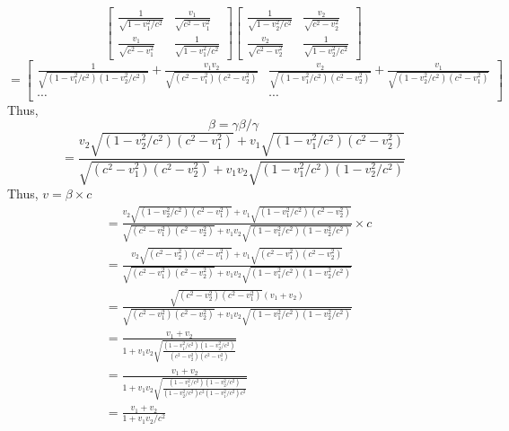 \documentclass{article}
\begin{document}
\begin{itemize}
                \[\begin{bmatrix} 
                        \frac{1}{\sqrt{1-v_1^2/c^2}}& \frac{v_1}{\sqrt{c^2-v_1^2}}\\
                        \frac{v_1}{\sqrt{c^2-v_1^2}}& \frac{1}{\sqrt{1-v_1^2/c^2}}
                \end{bmatrix}
                \begin{bmatrix}
                    \frac{1}{\sqrt{1-v_2^2/c^2}}& \frac{v_2}{\sqrt{c^2-v_2^2}}\\
                    \frac{v_2}{\sqrt{c^2-v_2^2}}& \frac{1}{\sqrt{1-v_2^2/c^2}}
                \end{bmatrix}\]\[=
                \begin{bmatrix}
                    \frac{1}{\sqrt{(1-v_1^2/c^2)(1-v_2^2/c^2)}}+\frac{v_1v_2}{\sqrt{(c^2-v_1^2)(c^2-v_2^2)}}&
                    \frac{v_2}{\sqrt{(1-v_1^2/c^2)(c^2-v_2^2)}}+\frac{v_1}{\sqrt{(1-v_2^2/c^2)(c^2-v_1^2)}}
                    \\ \cdots&\cdots
                \end{bmatrix}\]
                Thus, \[\beta = \gamma \beta / \gamma\]
                \[=\frac{v_2\sqrt{(1-v_2^2/c^2)(c^2-v_1^2)}+v_1\sqrt{(1-v_1^2/c^2)(c^2-v_2^2)}}{\sqrt{(c^2-v_1^2)(c^2-v_2^2)}+v_1v_2\sqrt{(1-v_1^2/c^2)(1-v_2^2/c^2)}}\]
                Thus, \(v = \beta \times c\)
                \begin{align*}
                    &=\frac{v_2\sqrt{(1-v_2^2/c^2)(c^2-v_1^2)}+v_1\sqrt{(1-v_1^2/c^2)(c^2-v_2^2)}}{\sqrt{(c^2-v_1^2)(c^2-v_2^2)}+v_1v_2\sqrt{(1-v_1^2/c^2)(1-v_2^2/c^2)}}
                    \times c\\&=\frac{v_2\sqrt{(c^2-v_2^2)(c^2-v_1^2)}+v_1\sqrt{(c^2-v_1^2)(c^2-v_2^2)}}{\sqrt{(c^2-v_1^2)(c^2-v_2^2)}+v_1v_2\sqrt{(1-v_1^2/c^2)(1-v_2^2/c^2)}}
                    \\&=\frac{\sqrt{(c^2-v_2^2)(c^2-v_1^2)}(v_1+v_2)}{\sqrt{(c^2-v_1^2)(c^2-v_2^2)}+v_1v_2\sqrt{(1-v_1^2/c^2)(1-v_2^2/c^2)}}
                    \\&=\frac{v_1+v_2}{1+v_1v_2\sqrt{\frac{(1-v_1^2/c^2)(1-v_2^2/c^2)}{(c^2-v_2^2)(c^2-v_1^2)}}}
                    \\&=\frac{v_1+v_2}{1+v_1v_2\sqrt{\frac{(1-v_1^2/c^2)(1-v_2^2/c^2)}{(1-v_2^2/c^2)c^2(1-v_1^2/c^2)c^2}}}
                    \\&=\frac{v_1+v_2}{1+v_1v_2/c^2}
                \end{align*}
\end{itemize}
\end{document}
